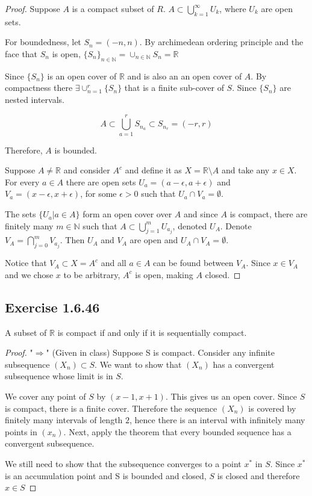 \documentclass{tufte-book}
\theoremstyle{mytheoremstyle}
\theoremstyle{mylemstyle}
\theoremstyle{mydefstyle}
\begin{document}
\begin{proof}
Suppose $A$ is a compact subset of $R$.  $A \subset \bigcup\limits_{k=1}^{\infty}U_k$, where $U_k$ are open sets.

For boundedness, let $S_n = (-n,n)$.  By archimedean ordering principle and the face that $S_n$ is open, $\{S_n\}_{n \in \mathbb{N}} = \cup_{n \in \mathbb{N}}S_n = \mathbb{R}$

Since $\{S_n\}$ is an open cover of $\mathbb{R}$ and is also an an open cover of $A$. By compactness there $\exists \cup_{n=1}^{r}\{S_n\}$ that is a finite sub-cover of $S$.  Since $\{S_n\}$ are nested intervals.

\[ A \subset \bigcup_{a=1}^rS_{n_{a}} \subset S_{n_{r}} = (-r, r)\]

Therefore, $A$ is bounded.

Suppose $A \neq \mathbb{R}$ and consider $A^c$ and define it as $X = \mathbb{R} \setminus A$ and take any $x \in X$. For every $a \in A$ there are open sets $U_a = (a-\epsilon,a+\epsilon)$ and $V_a = (x-\epsilon, x+\epsilon)$, for some $\epsilon > 0$ such that $U_a \cap V_a = \emptyset$.

The sets $\{U_a | a \in A\}$ form an open cover over $A$ and since $A$ is compact, there are finitely many $m \in \mathbb{N}$ such that $A \subset \bigcup\limits_{j=1}^{m}U_{a_{j}}$, denoted $U_A$.  Denote $V_A=\bigcap\limits_{j=0}^{m}V_{a_{j}}$.  Then $U_A$ and $V_A$ are open and $U_A \cap V_A = \emptyset$.

Notice that $V_A \subset X = A^c$ and all $a \in A$ can be found between $V_A$. Since $x \in V_A$ and we chose $x$ to be arbitrary,  $A^c$ is open, making $A$ closed.

\end{proof}

\subsection{Exercise 1.6.46}

A subset of $\mathbb{R}$ is compact if and only if it is sequentially compact.

\begin{proof}"$\Rightarrow$" (Given in class)
Suppose S is compact. Consider any infinite subsequence $(X_n) \subset S$.  We want to show that $(X_n)$ has a convergent subsequence whose limit is in $S$.

We cover any point of $S$ by $(x-1, x+1)$.  This gives us an open cover.  Since $S$ is compact, there is a finite cover.  Therefore the sequence $(X_n)$ is covered by finitely many intervals of length $2$, hence there is an interval with infinitely many points in $(x_n)$.  Next, apply the theorem that every bounded sequence has a convergent subsequence.  

We still need to show that the subsequence converges to a point $x^*$ in $S$. Since $x^*$ is an accumulation point and S is bounded and closed, $S$ is closed and therefore $x \in S$

\end{proof}
\end{document}
